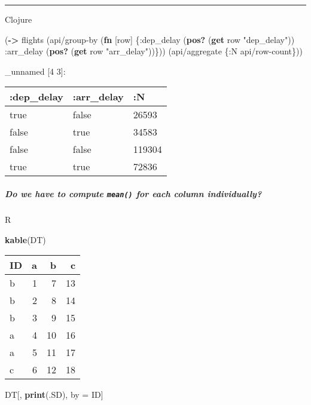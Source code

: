 \documentclass[]{article}
\newenvironment{Shaded}{\begin{snugshade}}{\end{snugshade}}
\newcommand{\KeywordTok}[1]{\textcolor[rgb]{0.13,0.29,0.53}{\textbf{#1}}}
\newcommand{\StringTok}[1]{\textcolor[rgb]{0.31,0.60,0.02}{#1}}
\newcommand{\AttributeTok}[1]{\textcolor[rgb]{0.77,0.63,0.00}{#1}}
\newcommand{\NormalTok}[1]{#1}
\let\oldsubparagraph\subparagraph
\renewcommand{\subparagraph}[1]{\oldsubparagraph{#1}\mbox{}}
\begin{document}
\begin{center}\rule{0.5\linewidth}{0.5pt}\end{center}

Clojure

\begin{Shaded}
\begin{Highlighting}[]
\NormalTok{(}\KeywordTok{->}\NormalTok{ flights}
\NormalTok{    (api/group-by (}\KeywordTok{fn}\NormalTok{ [row]}
\NormalTok{                    \{}\AttributeTok{:dep}\NormalTok{_delay (}\KeywordTok{pos?}\NormalTok{ (}\KeywordTok{get}\NormalTok{ row }\StringTok{"dep_delay"}\NormalTok{))}
                     \AttributeTok{:arr}\NormalTok{_delay (}\KeywordTok{pos?}\NormalTok{ (}\KeywordTok{get}\NormalTok{ row }\StringTok{"arr_delay"}\NormalTok{))\}))}
\NormalTok{    (api/aggregate \{}\AttributeTok{:N}\NormalTok{ api/row-count\}))}
\end{Highlighting}
\end{Shaded}

\_unnamed {[}4 3{]}:

\begin{longtable}[]{@{}lll@{}}
\toprule
:dep\_delay & :arr\_delay & :N\tabularnewline
\midrule
\endhead
true & false & 26593\tabularnewline
false & true & 34583\tabularnewline
false & false & 119304\tabularnewline
true & true & 72836\tabularnewline
\bottomrule
\end{longtable}

\subparagraph{\texorpdfstring{Do we have to compute \texttt{mean()} for
each column
individually?}{Do we have to compute mean() for each column individually?}}\label{do-we-have-to-compute-mean-for-each-column-individually}

R

\begin{Shaded}
\begin{Highlighting}[]
\KeywordTok{kable}\NormalTok{(DT)}
\end{Highlighting}
\end{Shaded}

\begin{longtable}[]{@{}lrrr@{}}
\toprule
ID & a & b & c\tabularnewline
\midrule
\endhead
b & 1 & 7 & 13\tabularnewline
b & 2 & 8 & 14\tabularnewline
b & 3 & 9 & 15\tabularnewline
a & 4 & 10 & 16\tabularnewline
a & 5 & 11 & 17\tabularnewline
c & 6 & 12 & 18\tabularnewline
\bottomrule
\end{longtable}

\begin{Shaded}
\begin{Highlighting}[]
\NormalTok{DT[, }\KeywordTok{print}\NormalTok{(.SD), by =}\StringTok{ }\NormalTok{ID]}
\end{Highlighting}
\end{Shaded}
\end{document}

